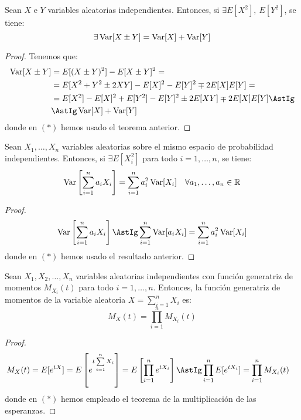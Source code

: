 \begin{coro}
    Sean $X$ e $Y$ variables aleatorias independientes. Entonces, si $\exists E[X^2],~E[Y^2]$, se tiene:
    \begin{equation*}
        \exists  \operatorname{Var}[X\pm Y] = \operatorname{Var}[X] + \operatorname{Var}[Y]
    \end{equation*}
\end{coro}
\begin{proof}
    Tenemos que:
    \begin{align*}
        \Var[X \pm Y] &= E[(X\pm Y)^2] - E[X\pm Y]^2
        =\\&= E[X^2 + Y^2 \pm 2XY] - E[X]^2 - E[Y]^2 \mp 2E[X]E[Y]
        =\\&= E[X^2] - E[X]^2 + E[Y^2] -E[Y]^2 \pm 2E[XY] \mp 2E[X]E[Y]
        \AstIg\\&\AstIg \Var[X] + \Var[Y]
    \end{align*}
    donde en $(\ast)$ hemos usado el teorema anterior.
\end{proof}

\begin{coro}
    Sean $X_1, \ldots, X_n$ variables aleatorias sobre el mismo espacio de probabilidad independientes. Entonces, si $\exists E[X_i^2]$ para todo $i = 1, \ldots, n$, se tiene:
    \[
        \operatorname{Var}\left[\sum_{i=1}^n a_i X_i\right] = \sum_{i=1}^n a_i^2\operatorname{Var}[X_i] \quad \forall a_1, \ldots, a_n \in \mathbb{R}
    \]
\end{coro}
\begin{proof}
    \begin{equation*}
        \Var\left[\sum_{i=1}^n a_iX_i\right]
        \AstIg \sum_{i=1}^n \Var[a_iX_i]
        = \sum_{i=1}^n a_i^2 \Var[X_i]
    \end{equation*}
    donde en $(\ast)$ hemos usado el resultado anterior.
\end{proof}


\begin{coro}\label{coro:generatriz_momentos_independientes}
    Sean $X_1,X_2,\ldots,X_n$ variables aleatorias independientes con función generatriz de momentos $M_{X_i}(t)$ para todo $i=1,\dots,n$. Entonces, la función generatriz de momentos de la variable aleatoria $X=\sum\limits_{i=1}^n X_i$ es:
    \begin{equation*}
        M_X(t)=\prod_{i=1}^n M_{X_i}(t)
    \end{equation*}
\end{coro}
\begin{proof}
    \begin{equation*}\begin{split}
        M_X(t)
        &= E[e^{tX}]
        = E\left[e^{t\sum\limits_{i=1}^n X_i}\right]
        = E\left[\prod_{i=1}^n e^{tX_i}\right]
        \AstIg \prod_{i=1}^n E[e^{tX_i}]
        = \prod_{i=1}^n M_{X_i}(t)
    \end{split}\end{equation*}
    donde en $(\ast)$ hemos empleado el teorema de la multiplicación de las esperanzas.
\end{proof}


